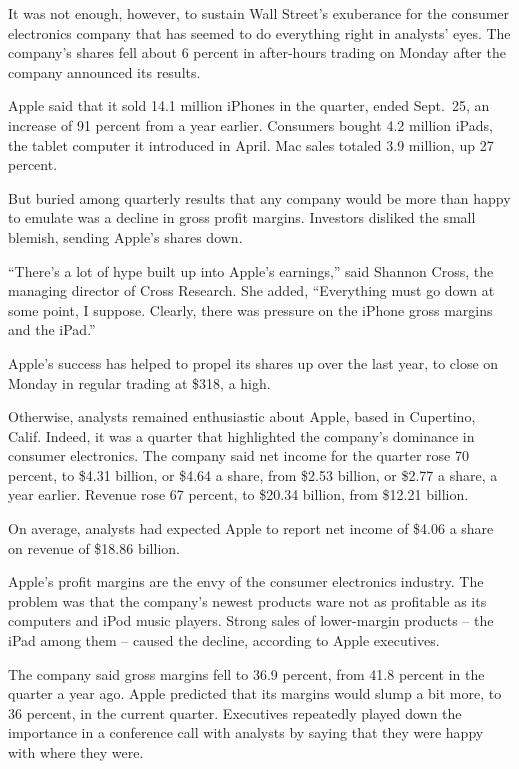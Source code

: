 ﻿\documentclass[12pt]{article}
\begin{document}
It was not enough, however, to sustain Wall Street's exuberance for the consumer electronics company
that has seemed to do everything right in analysts' eyes. The company's shares fell about 6 percent
in after-hours trading on Monday after the company announced its results.

Apple said that it sold 14.1 million iPhones in the quarter, ended Sept.~25, an increase of 91
percent from a year earlier. Consumers bought 4.2 million iPads, the tablet computer it introduced
in April. Mac sales totaled 3.9 million, up 27 percent.

But buried among quarterly results that any company would be more than happy to emulate was a
decline in gross profit margins. Investors disliked the small blemish, sending Apple's shares down.

``There's a lot of hype built up into Apple's earnings,'' said Shannon Cross, the managing director
of Cross Research. She added, ``Everything must go down at some point, I suppose. Clearly, there was
pressure on the iPhone gross margins and the iPad.''

Apple's success has helped to propel its shares up over the last year, to close on Monday in regular
trading at \$318, a high.

Otherwise, analysts remained enthusiastic about Apple, based in Cupertino, Calif. Indeed, it was a
quarter that highlighted the company's dominance in consumer electronics. The company said net
income for the quarter rose 70 percent, to \$4.31 billion, or \$4.64 a share, from \$2.53 billion,
or \$2.77 a share, a year earlier. Revenue rose 67 percent, to \$20.34 billion, from \$12.21
billion.

On average, analysts had expected Apple to report net income of \$4.06 a share on revenue of \$18.86
billion.

Apple's profit margins are the envy of the consumer electronics industry. The problem was that the
company's newest products ware not as profitable as its computers and iPod music players. Strong
sales of lower-margin products -- the iPad among them -- caused the decline, according to Apple
executives.

The company said gross margins fell to 36.9 percent, from 41.8 percent in the quarter a year ago.
Apple predicted that its margins would slump a bit more, to 36 percent, in the current quarter.
Executives repeatedly played down the importance in a conference call with analysts by saying that
they were happy with where they were.
\end{document}
